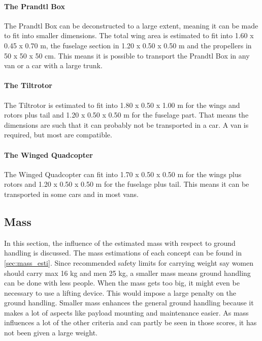 \paragraph{The Prandtl Box}
The Prandtl Box can be deconstructed to a large extent, meaning it can be made to fit into smaller dimensions. The total wing area is estimated to fit into 1.60 x 0.45 x 0.70 m, the fuselage section in 1.20 x 0.50 x 0.50 m and the propellers in 50 x 50 x 50 cm. This means it is possible to transport the Prandtl Box in any van or a car with a large trunk. 


\paragraph{The Tiltrotor}
The Tiltrotor is estimated to fit into 1.80 x 0.50 x 1.00 m for the wings and rotors plus tail and 1.20 x 0.50 x 0.50 m for the fuselage part. That means the dimensions are such that it can probably not be transported in a car. A van is required, but most are compatible. 


\paragraph{The Winged Quadcopter}
The Winged Quadcopter can fit into 1.70 x 0.50 x 0.50 m for the wings plus rotors and 1.20 x 0.50 x 0.50 m for the fuselage plus tail. This means it can be transported in some cars and in most vans.



\subsection{Mass}
In this section, the influence of the estimated mass with respect to ground handling is discussed. The mass estimations of each concept can be found in \autoref{sec:mass_esti}. Since recommended safety limits for carrying weight say women should carry max 16 kg and men 25 kg\footnotemark, a smaller mass means ground handling can be done with less people. When the mass gets too big, it might even be necessary to use a lifting device. This would impose a large penalty on the ground handling. Smaller mass enhances the general ground handling because it makes a lot of aspects like payload mounting and maintenance easier.
 As mass influences a lot of the other criteria and can partly be seen in those scores, it has not been given a large weight.



